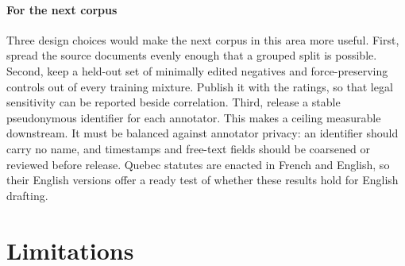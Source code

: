 \documentclass{BVP_JCLLT}
\begin{document}
{\paragraph{For the next corpus}
Three design choices would make the next corpus in this area more useful.
First, spread the source documents evenly enough that a grouped split is
possible. Second, keep a held-out set of minimally edited negatives and
force-preserving controls out of every training mixture. Publish it with the
ratings, so that legal sensitivity can be reported beside correlation. Third,
release a stable pseudonymous identifier for each annotator. This makes a
ceiling measurable downstream. It must be balanced against annotator privacy:
an identifier should carry no name, and timestamps and free-text fields should
be coarsened or reviewed before release. Quebec statutes are enacted in French
and English, so their English versions offer a ready test of whether these
results hold for English drafting.}

\section{Limitations}\label{sec:limits}
\end{document}
